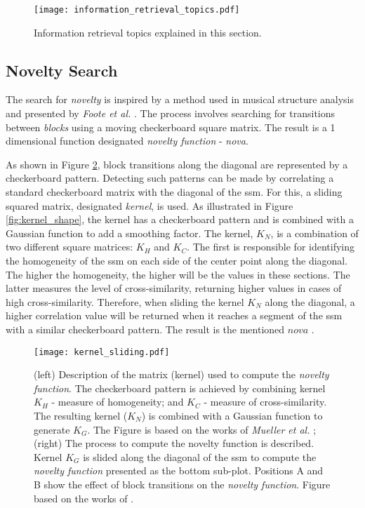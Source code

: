 \begin{figure}
\centering
\texttt{[image: information\_retrieval\_topics.pdf]}
\caption{Information retrieval topics explained in this section.}
\label{fig:info_retrieval_topics}
\end{figure}


\subsection{Novelty Search}

The search for \textit{novelty} is inspired by a method used in musical structure analysis and presented by \textit{Foote et al.} \cite{foote2000}. The process involves searching for transitions between \textit{blocks} using a moving checkerboard square matrix. The result is a 1 dimensional function designated \textit{novelty function} - \textit{nova}.
\par
As shown in Figure \ref{fig:kernel_description}, block transitions along the diagonal are represented by a checkerboard pattern. Detecting such patterns can be made by correlating a standard checkerboard matrix with the diagonal of the \gls{ssm}. For this, a sliding squared matrix, designated \textit{kernel}, is used. As illustrated in Figure \ref{fig:kernel_shape}, the kernel has a checkerboard pattern and is combined with a Gaussian function to add a smoothing factor. The kernel, $K_N$, is a combination of two different square matrices: $K_H$ and $K_C$. The first is responsible for identifying the homogeneity of the \gls{ssm} on each side of the center point along the diagonal. The higher the homogeneity, the higher will be the values in these sections. The latter measures the level of cross-similarity, returning higher values in cases of high cross-similarity. Therefore, when sliding the kernel $K_N$ along the diagonal, a higher correlation value will be returned when it reaches a segment of the \gls{ssm} with a similar checkerboard pattern. The result is the mentioned $nova$ \cite{Dannenberg2008, fmp1, fmp2}.

\begin{figure}
    \centering
    \texttt{[image: kernel\_sliding.pdf]}
    \caption{(left) Description of the matrix (kernel) used to compute the \textit{novelty function}. The checkerboard pattern is achieved by combining kernel $K_H$ - measure of homogeneity; and $K_C$ - measure of cross-similarity. The resulting kernel ($K_N$) is combined with a Gaussian function to generate $K_G$. The Figure is based on the works of \textit{Mueller et al.} \cite{fmp1, fmp2}; (right) The process to compute the novelty function is described. Kernel $K_G$ is slided along the diagonal of the \gls{ssm} to compute the \textit{novelty function} presented as the bottom sub-plot. Positions A and B show the effect of block transitions on the \textit{novelty function}. Figure based on the works of \cite{Dannenberg2008, fmp1, fmp2}.}
    \label{fig:kernel_description}
\end{figure}

